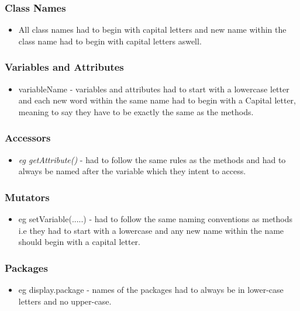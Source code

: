 \documentclass[12pt]{article}
\begin{document}
     \subsubsection{Class Names}
      	\begin{itemize}
      	\item All class names had to begin with capital letters and new name within the class name had to begin with capital letters aswell.
      	\end{itemize}
      	
    	  \subsubsection{Variables and Attributes} 
      \begin{itemize}
     	\item variableName - variables and attributes had to start with a lowercase letter and each new word within the same name had to begin with a Capital letter, meaning to say they have to be exactly the same 	as the methods.
     	\end{itemize}
     	\subsubsection{Accessors}
   \begin{itemize} 
 	 \item {\it eg getAttribute()} - had to follow the same rules as the methods and had to always be named after the variable which they intent to access.
 	 \end{itemize} 
 	 
  \subsubsection{Mutators}
   \begin{itemize} 
 	 \item eg setVariable(.....) - had to  follow the same naming conventions as methods i.e they had to start with a lowercase and any new name within the name should begin with a capital letter.
 	  \end{itemize} 
 	    \subsubsection{Packages} 
   \begin{itemize}
 	 \item eg display.package -  names of the packages had to  always be in lower-case letters and no 			upper-case.
 	 \end{itemize} 
 	 
\end{document}
